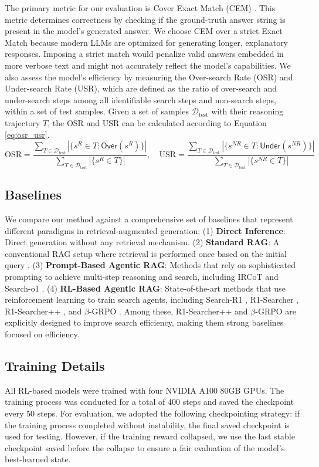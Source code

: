 \documentclass{article}
\begin{document}
The primary metric for our evaluation is Cover Exact Match (CEM) . This metric determines correctness by checking if the ground-truth answer string is present in the model's generated answer. We choose CEM over a strict Exact Match because modern LLMs are optimized for generating longer, explanatory responses. Imposing a strict match would penalize valid answers embedded in more verbose text and might not accurately reflect the model's capabilities. We also assess the model's efficiency by measuring the Over-search Rate (OSR) and Under-search Rate (USR), which are defined as the ratio of over-search and under-search steps among all identifiable search steps and non-search steps, within a set of test samples. Given a set of samples $\mathcal{D}_{\text{test}}$ with their reasoning trajectory $T$, the OSR and USR can be calculated according to Equation \ref{eq:osr_usr}.
\begin{equation}
\label{eq:osr_usr}
\text{OSR} = \frac{\sum_{T \in \mathcal{D}_{\text{test}}} |\{ s^R \in T : \textsf{Over}(s^R) \}|}{\sum_{T \in \mathcal{D}_{\text{test}}} |\{ s^R \in T \}|},
\quad
\text{USR} = \frac{\sum_{T \in \mathcal{D}_{\text{test}}} |\{ s^{NR} \in T : \textsf{Under}(s^{NR}) \}|}{\sum_{T \in \mathcal{D}_{\text{test}}} |\{ s^{NR} \in T \}|}
\end{equation}

\subsection{Baselines}
\label{ssec:baselines}
We compare our method against a comprehensive set of baselines that represent different paradigms in retrieval-augmented generation: (1) \textbf{Direct Inference}: Direct generation without any retrieval mechanism. (2) \textbf{Standard RAG}: A conventional RAG setup where retrieval is performed once based on the initial query . (3) \textbf{Prompt-Based Agentic RAG}: Methods that rely on sophisticated prompting to achieve multi-step reasoning and search, including IRCoT and Search-o1 . (4) \textbf{RL-Based Agentic RAG}: State-of-the-art methods that use reinforcement learning to train search agents, including Search-R1 , R1-Searcher , R1-Searcher++ , and $\beta$-GRPO . Among these, R1-Searcher++ and $\beta$-GRPO are explicitly designed to improve search efficiency, making them strong baselines focused on efficiency.

\subsection{Training Details}
\label{ssec:training_details}
All RL-based models were trained with four NVIDIA A100 80GB GPUs. The training process was conducted for a total of 400 steps and saved the checkpoint every 50 steps. For evaluation, we adopted the following checkpointing strategy: if the training process completed without instability, the final saved checkpoint is used for testing. However, if the training reward collapsed, we use the last stable checkpoint saved before the collapse to ensure a fair evaluation of the model's best-learned state.
\end{document}
